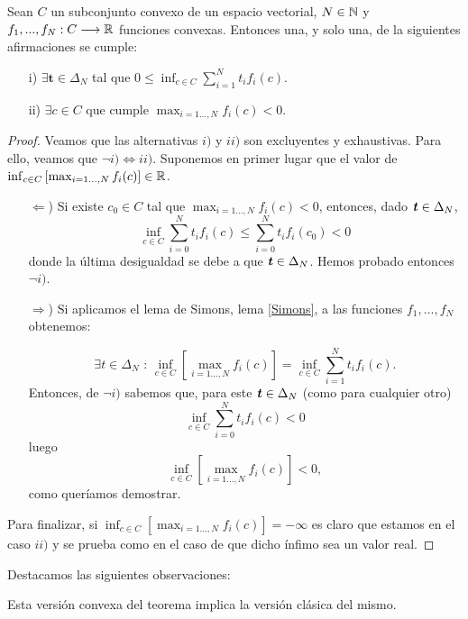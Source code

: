 \bigskip
\begin{teoremaBox}\label{Gordan}
	Sean $ C $ un subconjunto convexo de un espacio vectorial, $ N \in \mathbb{N} $ y  $ f_1,...,f_N : C \longrightarrow \mathbb{R} $ funciones convexas. Entonces una, y solo una, de la siguientes afirmaciones se cumple:
	\begin{itemize}
		\item[i)] $ \exists \mathbf{t} \in \Delta_N $ tal que $ 0 \leq \displaystyle \inf_{c\in C}  \sum_{i=1}^{N}{t_i f_i (c)}$.
		\item[ii)] $ \exists c \in C $ que cumple $\displaystyle \max_{i=1\dots,N } f_i(c) < 0 $.
	\end{itemize}
\end{teoremaBox}
\begin{proof}
	Veamos que las alternativas $ i)$ y $ ii) $ son excluyentes y exhaustivas. Para ello, veamos que $ \neg i) \Longleftrightarrow ii) $. Suponemos en primer lugar que el valor de $  \inf_{ c\in C}\left[\max_{i=1\dots,N } f_i(c) \right] \in \mathbb{R} $.
	
	\begin{itemize}
		\item [$ \Leftarrow $)] Si existe $ c_0 \in C $ tal que $ \max_{i=1\dots,N } f_i(c) < 0 $, entonces, dado $ \textbf{\emph{t}} \in \Delta_N $,
		\[
		\inf_{ c \in C} \sum_{i=0}^{N}t_i f_i(c) \leq \sum_{i=0}^{N}t_i f_i(c_0) < 0
		\]
		donde la última desigualdad se debe a que $ \textbf{\emph{t}} \in \Delta_N $. Hemos probado entonces $ \neg i) $.
		\item[$ \Rightarrow $)] 	Si aplicamos el lema de Simons, lema \ref{Simons}, a las funciones $ f_1,...,f_N $ obtenemos:
		
		\begin{equation*}
		\exists t \in \Delta_N \text{ : } \inf_{ c\in C}\left[\max_{i=1\dots,N } f_i(c) \right] = \inf_{c \in C} \sum_{i=1}^{N}t_i f_i (c).
		\end{equation*}
		Entonces, de $ \neg i) $ sabemos que, para este $ \textbf{\emph{t}} \in \Delta_N $ (como para cualquier otro)
		\[
		\inf_{ c \in C} \sum_{i=0}^{N}t_i f_i(c) < 0
		\]
		luego
		\[
		\inf_{ c\in C}\left[\max_{i=1\dots,N } f_i(c) \right] < 0,
		\]
		como queríamos demostrar.
		
	\end{itemize}
	
	Para finalizar, si $  \inf_{ c\in C}\left[\max_{i=1\dots,N } f_i(c) \right] =-\infty $ es claro que estamos en el caso $ ii) $ y se prueba como en el caso de que dicho ínfimo sea un valor real.
\end{proof}
\bigskip
Destacamos las siguientes observaciones:
\bigskip
\begin{observacion}
	Esta versión convexa del teorema implica la versión clásica del mismo.
\end{observacion}

